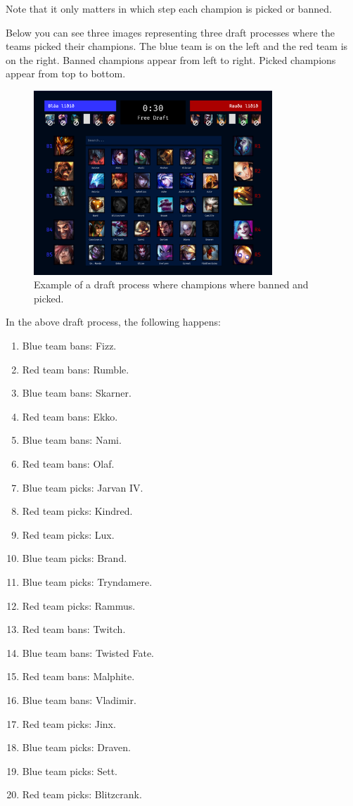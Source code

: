 Note that it only matters in which step each champion is picked or banned.

Below you can see three images representing three draft processes where the teams picked their champions.
The blue team is on the left and the red team is on the right.
Banned champions appear from left to right.
Picked champions appear from top to bottom.

\begin{figure}[h!]
  \centering
    \includegraphics[width=0.8\textwidth]{original_draft.png}
  \caption{Example of a draft process where champions where banned and picked.}
\end{figure}

In the above draft process, the following happens:
\begin{enumerate}
    \item Blue team bans: Fizz.
    \item Red team bans: Rumble.
    \item Blue team bans: Skarner.
    \item Red team bans: Ekko.
    \item Blue team bans: Nami.
    \item Red team bans: Olaf.
    \item Blue team picks: Jarvan IV.
    \item Red team picks: Kindred.
    \item Red team picks: Lux.
    \item Blue team picks: Brand.
    \item Blue team picks: Tryndamere.
    \item Red team picks: Rammus.
    \item Red team bans: Twitch.
    \item Blue team bans: Twisted Fate.
    \item Red team bans: Malphite.
    \item Blue team bans: Vladimir.
    \item Red team picks: Jinx.
    \item Blue team picks: Draven.
    \item Blue team picks: Sett.
    \item Red team picks: Blitzcrank.
\end{enumerate}

